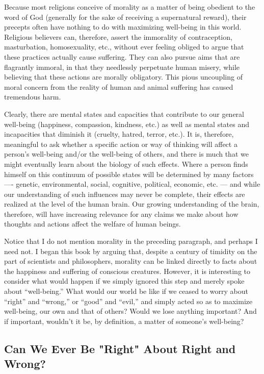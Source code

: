 \documentclass[a4paper,14pt]{extarticle}
\begin{document}
Because most religions conceive of morality as a matter of being obedient to the word of God (generally for the sake of receiving a supernatural reward), their precepts often have nothing to do with maximizing well-being in this world.
Religious believers can, therefore, assert the immorality of contraception, masturbation, homosexuality, etc., without ever feeling obliged to argue that these practices actually cause suffering.
They can also pursue aims that are flagrantly immoral, in that they needlessly perpetuate human misery, while believing that these actions are morally obligatory.
This pious uncoupling of moral concern from the reality of human and animal suffering has caused tremendous harm.

Clearly, there are mental states and capacities that contribute to our general well-being (happiness, compassion, kindness, etc.) as well as mental states and incapacities that diminish it (cruelty, hatred, terror, etc.).
It is, therefore, meaningful to ask whether a specific action or way of thinking will affect a person's well-being and/or the well-being of others, and there is much that we might eventually learn about the biology of such effects.
Where a person finds himself on this continuum of possible states will be determined by many factors ---- genetic, environmental, social, cognitive, political, economic, etc. --- and while our understanding of such influences may never be complete, their effects are realized at the level of the human brain.
Our growing understanding of the brain, therefore, will have increasing relevance for any claims we make about how thoughts and actions affect the welfare of human beings.

Notice that I do not mention morality in the preceding paragraph, and perhaps I need not.
I began this book by arguing that, despite a century of timidity on the part of scientists and philosophers, morality can be linked directly to facts about the happiness and suffering of conscious creatures.
However, it is interesting to consider what would happen if we simply ignored this step and merely spoke about ``well-being.''
What would our world be like if we ceased to worry about ``right'' and ``wrong,'' or ``good'' and ``evil,'' and simply acted so as to maximize well-being, our own and that of others?
Would we lose anything important?
And if important, wouldn't it be, by definition, a matter of someone's well-being?

\subsection{Can We Ever Be "Right" About Right and Wrong?}
\end{document}

